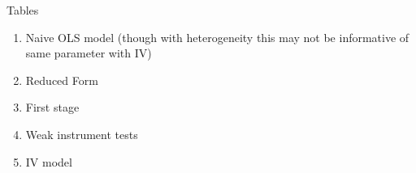 \documentclass{beamer}
\begin{document}
\begin{frame}{Tables}

\begin{enumerate}
\item Naive OLS model (though with heterogeneity this may not be informative of same parameter with IV)
\item Reduced Form
\item First stage
\item Weak instrument tests
\item IV model
\end{enumerate}

\end{frame}



\begin{frame}[plain]


\end{frame}
\end{document}
